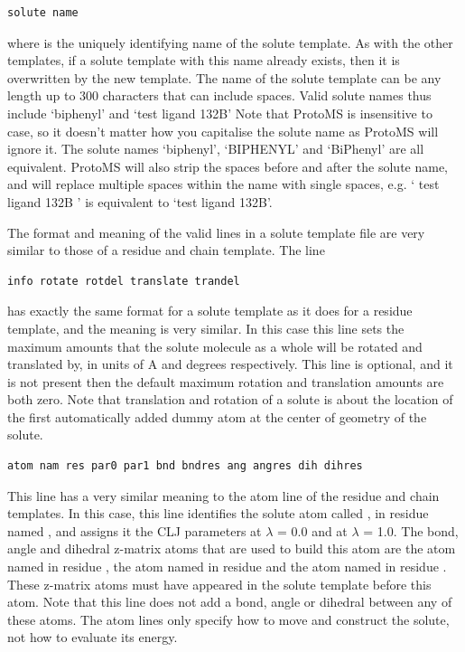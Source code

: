 \documentclass[letterpaper,10pt,english]{manual}
\begin{document}
\begin{Verbatim}[commandchars=@\[\]]
solute name
\end{Verbatim}

where  is the uniquely identifying name of the solute template. As with the other templates, if a solute template with this name already exists, then it is overwritten by the new template. The name of the solute template can be any length up to 300 characters that can include spaces. Valid solute names thus include ‘biphenyl’ and ‘test ligand 132B’ Note that ProtoMS is insensitive to case, so it doesn’t matter how you capitalise the solute name as ProtoMS will ignore it. The solute names ‘biphenyl’, ‘BIPHENYL’ and ‘BiPhenyl’ are all equivalent. ProtoMS will also strip the spaces before and after the solute name, and will replace multiple spaces within the name with single spaces, e.g. ‘ test ligand 132B ’ is equivalent to ‘test ligand 132B’.

The format and meaning of the valid lines in a solute template file are very similar to those of a residue and chain template. The line

\begin{Verbatim}[commandchars=@\[\]]
info rotate rotdel translate trandel
\end{Verbatim}

has exactly the same format for a solute template as it does for a residue template, and the meaning is very similar. In this case this line sets the maximum amounts that the solute molecule as a whole will be rotated and translated by, in units of A and degrees respectively. This line is optional, and it is not present then the default maximum rotation and translation amounts are both zero. Note that translation and rotation of a solute is about the location of the first automatically added dummy atom at the center of geometry of the solute.

\begin{Verbatim}[commandchars=@\[\]]
atom nam res par0 par1 bnd bndres ang angres dih dihres
\end{Verbatim}

This line has a very similar meaning to the atom line of the residue and chain templates. In this case, this line identifies the solute atom called , in residue named , and assigns it the CLJ parameters  at $\lambda$ = 0.0 and  at $\lambda$ = 1.0. The bond, angle and dihedral z-matrix atoms that are used to build this atom are the atom named  in residue , the atom named  in residue  and the atom named  in residue . These z-matrix atoms must have appeared in the solute template before this atom. Note that this line does not add a bond, angle or dihedral between any of these atoms. The atom lines only specify how to move and construct the solute, not how to evaluate its energy.
\end{document}
